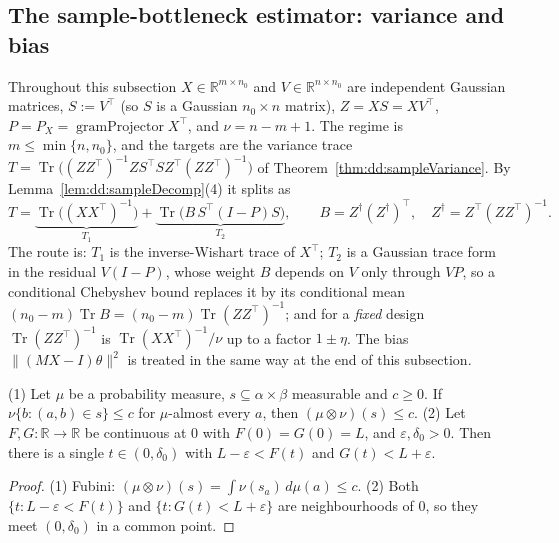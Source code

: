\subsection{The sample-bottleneck estimator: variance and bias}\label{sec:dd:sampleprob}

Throughout this subsection $X\in\mathbb R^{m\times n_0}$ and $V\in\mathbb R^{n\times n_0}$ are independent Gaussian matrices, $S:=V^\top$ (so $S$ is a Gaussian $n_0\times n$ matrix), $Z=XS=XV^\top$, $P=P_X=\operatorname{gramProjector}X^\top$, and
$\nu=n-m+1$. The regime is $m\le\min\{n,n_0\}$, and the targets are the variance trace
$T=\operatorname{Tr}\bigl((ZZ^\top)^{-1}ZS^\top SZ^\top(ZZ^\top)^{-1}\bigr)$ of Theorem~\ref{thm:dd:sampleVariance}. By Lemma~\ref{lem:dd:sampleDecomp}(4) it splits as
\[
  T=\underbrace{\operatorname{Tr}\bigl((XX^\top)^{-1}\bigr)}_{T_1}+\underbrace{\operatorname{Tr}\bigl(B\,S^\top(I-P)S\bigr)}_{T_2},\qquad B=Z^\dagger(Z^\dagger)^\top,\quad Z^\dagger=Z^\top(ZZ^\top)^{-1}.
\]
The route is: $T_1$ is the inverse-Wishart trace of $X^\top$; $T_2$ is a Gaussian trace form in the residual $V(I-P)$, whose weight $B$ depends on $V$ only through $VP$, so a conditional Chebyshev bound
replaces it by its conditional mean $(n_0-m)\operatorname{Tr}B=(n_0-m)\operatorname{Tr}(ZZ^\top)^{-1}$; and for a \emph{fixed} design $\operatorname{Tr}(ZZ^\top)^{-1}$ is $\operatorname{Tr}(XX^\top)^{-1}/\nu$ up to a factor $1\pm\eta$.
The bias $\|(MX-I)\theta\|^2$ is treated in the same way at the end of this subsection.

\begin{lemma}\label{lem:dd:bookkeeping}
  \leanok
(1) Let $\mu$ be a probability measure, $s\subseteq\alpha\times\beta$ measurable and $c\ge0$. If $\nu\{b:(a,b)\in s\}\le c$ for $\mu$-almost every $a$, then $(\mu\otimes\nu)(s)\le c$.
(2) Let $F,G:\mathbb R\to\mathbb R$ be continuous at $0$ with $F(0)=G(0)=L$, and $\varepsilon,\delta_0>0$. Then there is a single $t\in(0,\delta_0)$ with $L-\varepsilon<F(t)$ and $G(t)<L+\varepsilon$.
\end{lemma}

\begin{proof}
  \leanok
(1) Fubini: $(\mu\otimes\nu)(s)=\int\nu(s_a)\,d\mu(a)\le c$. (2) Both $\{t: L-\varepsilon<F(t)\}$ and $\{t:G(t)<L+\varepsilon\}$ are neighbourhoods of $0$, so they meet $(0,\delta_0)$ in a common point.
\end{proof}

